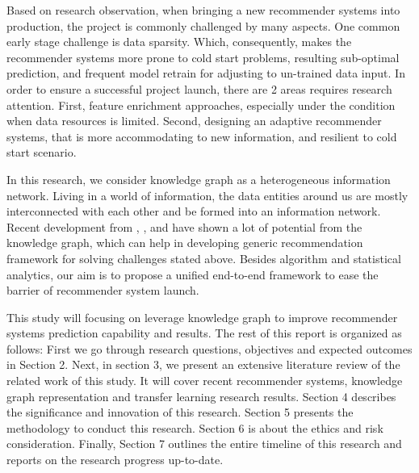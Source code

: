 Based on research observation, when bringing a new recommender systems into production, the project is commonly challenged by many aspects. One common early stage challenge is data sparsity. Which, consequently, makes the recommender systems more prone to cold start problems, resulting sub-optimal prediction, and frequent model retrain for adjusting to un-trained data input. In order to ensure a successful project launch, there are 2 areas requires research attention. First, feature enrichment approaches, especially under the condition when data resources is limited. Second, designing an adaptive recommender systems, that is more accommodating to new information, and resilient to cold start scenario. 

In this research, we consider knowledge graph as a heterogeneous information network. Living in a world of information, the data entities around us are mostly interconnected with each other and be formed into an information network. Recent development from \citet{qin2020survey}, \citet{wang2018ripplenet}, and \citet{xi2020graph} have shown a lot of potential from the knowledge graph, which can help in developing generic recommendation framework for solving challenges stated above. Besides algorithm and statistical analytics, our aim is to propose a unified end-to-end framework to ease the barrier of recommender system launch.


This study will focusing on leverage knowledge graph to improve recommender systems prediction capability and results. The rest of this report is organized as follows: 
First we go through research questions, objectives and expected outcomes in Section 2. Next, in section 3, we present an extensive literature review of the related work of this study. It will cover recent recommender systems, knowledge graph representation and transfer learning research results. Section 4 describes the significance and innovation of this research. Section 5 presents the methodology to conduct this research. Section 6 is about the ethics and risk consideration. Finally, Section 7 outlines the entire timeline of this research and reports on the research progress up-to-date.


